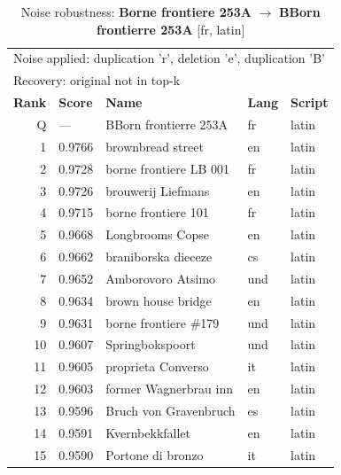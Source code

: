 \begin{table}[htbp]
\centering
\small
\caption{Noise robustness: \textbf{Borne frontiere 253A} $\rightarrow$ \textbf{BBorn frontierre 253A} [fr, latin]}
\label{tab:noise-8}
\begin{tabular}{rllll}
\toprule
\multicolumn{5}{l}{\small Noise applied: duplication 'r', deletion 'e', duplication 'B'} \\
\multicolumn{5}{l}{\small Recovery: original not in top-k} \\
\midrule
\textbf{Rank} & \textbf{Score} & \textbf{Name} & \textbf{Lang} & \textbf{Script} \\
\midrule
\rowcolor{gray!20} Q & --- & BBorn frontierre 253A & fr & latin \\
\midrule
1 & 0.9766 & brownbread street & en & latin \\
2 & 0.9728 & borne frontiere LB 001 & fr & latin \\
3 & 0.9726 & brouwerij Liefmans & en & latin \\
4 & 0.9715 & borne frontiere 101 & fr & latin \\
5 & 0.9668 & Longbrooms Copse & en & latin \\
6 & 0.9662 & braniborska dieceze & cs & latin \\
7 & 0.9652 & Amborovoro Atsimo & und & latin \\
8 & 0.9634 & brown house bridge & en & latin \\
9 & 0.9631 & borne frontiere \#179 & und & latin \\
10 & 0.9607 & Springbokspoort & und & latin \\
11 & 0.9605 & proprieta Converso & it & latin \\
12 & 0.9603 & former Wagnerbrau inn & en & latin \\
13 & 0.9596 & Bruch von Gravenbruch & es & latin \\
14 & 0.9591 & Kvernbekkfallet & en & latin \\
15 & 0.9590 & Portone di bronzo & it & latin \\
\bottomrule
\end{tabular}
\end{table}

